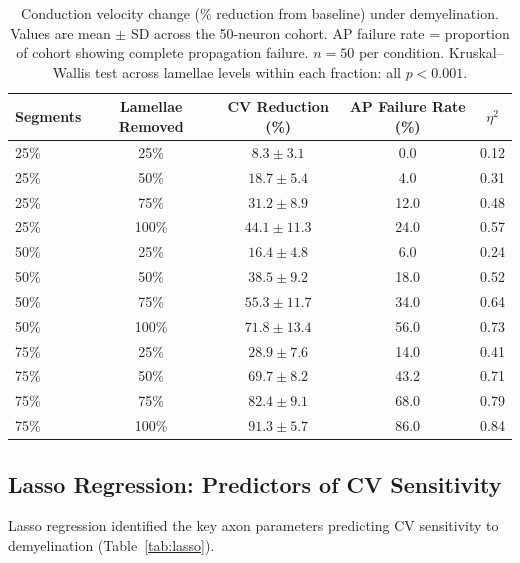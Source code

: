 \documentclass[11pt]{article}
\begin{document}
\begin{table}[H]
\centering
\caption{Conduction velocity change (\% reduction from baseline) under demyelination. Values are mean $\pm$ SD across the 50-neuron cohort. AP failure rate = proportion of cohort showing complete propagation failure. $n = 50$ per condition. Kruskal--Wallis test across lamellae levels within each fraction: all $p < 0.001$.}
\label{tab:demyelin_cv}
\begin{tabular}{lcccc}
\toprule
\textbf{Segments} & \textbf{Lamellae Removed} & \textbf{CV Reduction (\%)} & \textbf{AP Failure Rate (\%)} & \textbf{$\eta^2$} \\
\midrule
25\% & 25\% & $8.3 \pm 3.1$ & 0.0 & 0.12 \\
25\% & 50\% & $18.7 \pm 5.4$ & 4.0 & 0.31 \\
25\% & 75\% & $31.2 \pm 8.9$ & 12.0 & 0.48 \\
25\% & 100\% & $44.1 \pm 11.3$ & 24.0 & 0.57 \\
\midrule
50\% & 25\% & $16.4 \pm 4.8$ & 6.0 & 0.24 \\
50\% & 50\% & $38.5 \pm 9.2$ & 18.0 & 0.52 \\
50\% & 75\% & $55.3 \pm 11.7$ & 34.0 & 0.64 \\
50\% & 100\% & $71.8 \pm 13.4$ & 56.0 & 0.73 \\
\midrule
75\% & 25\% & $28.9 \pm 7.6$ & 14.0 & 0.41 \\
75\% & 50\% & $\mathbf{69.7 \pm 8.2}$ & 43.2 & 0.71 \\
75\% & 75\% & $82.4 \pm 9.1$ & 68.0 & 0.79 \\
75\% & 100\% & $91.3 \pm 5.7$ & 86.0 & 0.84 \\
\bottomrule
\end{tabular}
\end{table}

\subsection{Lasso Regression: Predictors of CV Sensitivity}

Lasso regression \citep{tibshirani1996regression} identified the key axon parameters predicting CV sensitivity to demyelination (Table~\ref{tab:lasso}).
\end{document}
